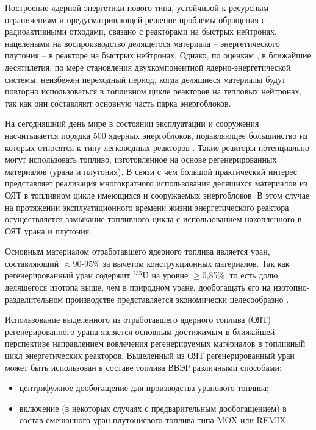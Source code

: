 {\actuality}
Построение ядерной энергетики нового типа, устойчивой к ресурсным ограничениям и предусматривающей решение проблемы обращения с радиоактивными отходами, связано с реакторами на быстрых нейтронах, нацелеными на воспроизводство делящегося материала -- энергетического  плутония -- в реакторе на быстрых нейтронах. Однако, по оценкам \cite{andrianovaPerspektivnyeToplivnyeZagruzki2015}, в ближайшие десятилетия, по мере становления двухкомпонентной ядерно-энергетической системы, неизбежен переходный период, когда делящиеся материалы будут повторно использоваться в топливном цикле реакторов на тепловых нейтронах, так как они составляют основную часть парка энергоблоков.


На сегодняшний день мире в состоянии эксплуатации и сооружения насчитывается порядка 500 ядерных энергоблоков, подавляющее большинство из которых относятся к типу легководных реакторов \cite{PRISHome}. Такие реакторы потенциально могут использовать топливо, изготовленное на основе регенерированных материалов (урана и плутония). В связи с чем большой практический интерес представляет реализация многократного использования делящихся материалов из ОЯТ в топливном цикле имеющихся и сооружаемых энергоблоков. В этом случае на протяжении эксплуатационного времени жизни энергетического реактора осуществляется замыкание топливного цикла с использованием накопленного в ОЯТ урана и плутония.

Основным материалом отработавшего ядерного топлива является уран, составляющий $\approx$90-95\% за вычетом конструкционных материалов. Так как регенерированный уран содержит $^{235}$U на уровне $\geq$0,85\%, то есть долю делящегося изотопа выше, чем в природном уране, дообогащать его на изотопно-разделительном производстве представляется экономически целесообразно \cite{NikipelovNikipelovSudby}.

Использование выделенного из отработавшего ядерного топлива (ОЯТ) регенерированного урана является основным достижимым в ближайшей перспективе направлением вовлечения регенерируемых материалов в топливный цикл энергетических реакторов. Выделенный из ОЯТ регенерированный уран может быть использован в составе топлива ВВЭР различными способами:
\begin{itemize}
  \item центрифужное дообогащение для производства уранового топлива;
  \item включение (в некоторых случаях с предварительным дообогащением) в состав смешанного уран-плутониевого топлива типа MOX или REMIX.
\end{itemize}
 
